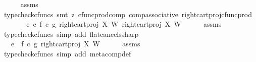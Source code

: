 \begin{isabellebody}
\ \ \ \ \isamarkupfalse%
\ assms\ \isamarkupfalse%
\ {\isacharparenleft}{\kern0pt}typecheck{\isacharunderscore}{\kern0pt}cfuncs{\isacharcomma}{\kern0pt}\ smt\ {\isacharparenleft}{\kern0pt}z{}{\isacharparenright}{\kern0pt}\ cfunc{\isacharunderscore}{\kern0pt}prod{\isacharunderscore}{\kern0pt}comp\ comp{\isacharunderscore}{\kern0pt}associative{}\ right{\isacharunderscore}{\kern0pt}cart{\isacharunderscore}{\kern0pt}proj{\isacharunderscore}{\kern0pt}cfunc{\isacharunderscore}{\kern0pt}prod{\isacharparenright}{\kern0pt}\isanewline
\ \ \isamarkupfalse%
\ \isamarkupfalse%
\ {\isachardoublequoteopen}{\isachardot}{\kern0pt}{\isachardot}{\kern0pt}{\isachardot}{\kern0pt}\ {\isacharequal}{\kern0pt}\ {\isacharparenleft}{\kern0pt}e\isactrlsup {\isasymflat}\ {\isasymcirc}\isactrlsub c\ {\isasymlangle}{\isacharparenleft}{\kern0pt}f\isactrlsup {\isasymflat}\ {\isasymcirc}\isactrlsub c\ {\isasymlangle}g\isactrlsup {\isasymflat}{\isacharcomma}{\kern0pt}\ right{\isacharunderscore}{\kern0pt}cart{\isacharunderscore}{\kern0pt}proj\ X\ W{\isasymrangle}{\isacharparenright}{\kern0pt}\isactrlsup {\isasymsharp}\isactrlsup {\isasymflat}\ {\isacharcomma}{\kern0pt}right{\isacharunderscore}{\kern0pt}cart{\isacharunderscore}{\kern0pt}proj\ X\ W{\isasymrangle}{\isacharparenright}{\kern0pt}\isactrlsup {\isasymsharp}{\isachardoublequoteclose}\isanewline
\ \ \ \ \isamarkupfalse%
\ assms\ \isamarkupfalse%
\ {\isacharparenleft}{\kern0pt}typecheck{\isacharunderscore}{\kern0pt}cfuncs{\isacharcomma}{\kern0pt}\ simp\ add{\isacharcolon}{\kern0pt}\ flat{\isacharunderscore}{\kern0pt}cancels{\isacharunderscore}{\kern0pt}sharp{\isacharparenright}{\kern0pt}\isanewline
\ \ \isamarkupfalse%
\ \isamarkupfalse%
\ {\isachardoublequoteopen}{\isachardot}{\kern0pt}{\isachardot}{\kern0pt}{\isachardot}{\kern0pt}\ {\isacharequal}{\kern0pt}\ e\ {\isasymbox}\ {\isacharparenleft}{\kern0pt}f\isactrlsup {\isasymflat}\ {\isasymcirc}\isactrlsub c\ {\isasymlangle}g\isactrlsup {\isasymflat}{\isacharcomma}{\kern0pt}\ right{\isacharunderscore}{\kern0pt}cart{\isacharunderscore}{\kern0pt}proj\ X\ W{\isasymrangle}{\isacharparenright}{\kern0pt}\isactrlsup {\isasymsharp}{\isachardoublequoteclose}\isanewline
\ \ \ \ \isamarkupfalse%
\ assms\ \isamarkupfalse%
\ {\isacharparenleft}{\kern0pt}typecheck{\isacharunderscore}{\kern0pt}cfuncs{\isacharcomma}{\kern0pt}\ simp\ add{\isacharcolon}{\kern0pt}\ meta{\isacharunderscore}{\kern0pt}comp{}{\isacharunderscore}{\kern0pt}def{}{\isacharparenright}{\kern0pt}\isanewline

\end{isabellebody}
